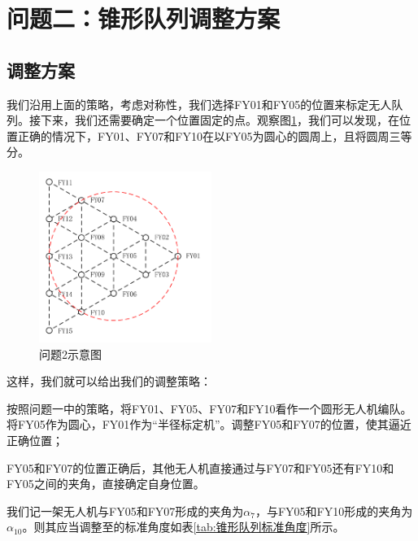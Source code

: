 \documentclass[12pt,AutoFakeSlant,AutoFakeBold]{article}
\begin{document}
\section{问题二：锥形队列调整方案}

\subsection{调整方案}

我们沿用上面的策略，考虑对称性，我们选择FY01和FY05的位置来标定无人队列。接下来，我们还需要确定一个位置固定的点。观察图\ref{fig:问题2示意图}，我们可以发现，在位置正确的情况下，FY01、FY07和FY10在以FY05为圆心的圆周上，且将圆周三等分。
\begin{figure}[!ht]
    \centering
    \includegraphics[width=0.5\textwidth]{图片/问题2示意图.pdf}
    \caption{问题2示意图}
    \label{fig:问题2示意图}
\end{figure}

这样，我们就可以给出我们的调整策略：

\begin{enumerate*}
    \item 按照问题一中的策略，将FY01、FY05、FY07和FY10看作一个圆形无人机编队。将FY05作为圆心，FY01作为“半径标定机”。调整FY05和FY07的位置，使其逼近正确位置；
    \item FY05和FY07的位置正确后，其他无人机直接通过与FY07和FY05还有FY10和FY05之间的夹角，直接确定自身位置。
\end{enumerate*}

我们记一架无人机与FY05和FY07形成的夹角为$\alpha_7$，与FY05和FY10形成的夹角为$\alpha_{10}$。则其应当调整至的标准角度如表\ref{tab:锥形队列标准角度}所示。
\end{document}
